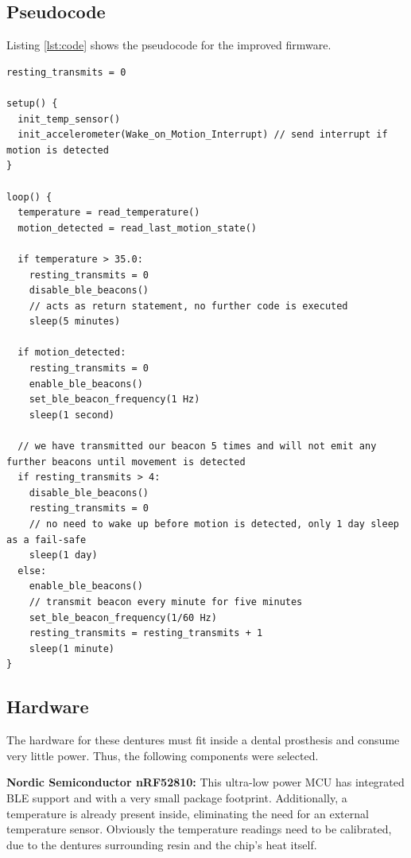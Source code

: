 \documentclass[a4paper,12pt]{article}
\begin{document}
\subsection{Pseudocode}
Listing \ref{lst:code} shows the pseudocode for the improved firmware.
\begin{lstlisting}[label=lst:code, caption=Firmware Pseudocode]
resting_transmits = 0

setup() {
  init_temp_sensor()
  init_accelerometer(Wake_on_Motion_Interrupt) // send interrupt if motion is detected
}

loop() {
  temperature = read_temperature()
  motion_detected = read_last_motion_state()

  if temperature > 35.0:
    resting_transmits = 0
    disable_ble_beacons()
    // acts as return statement, no further code is executed
    sleep(5 minutes)

  if motion_detected:
    resting_transmits = 0
    enable_ble_beacons()
    set_ble_beacon_frequency(1 Hz)
    sleep(1 second)

  // we have transmitted our beacon 5 times and will not emit any further beacons until movement is detected
  if resting_transmits > 4:
    disable_ble_beacons()
    resting_transmits = 0
    // no need to wake up before motion is detected, only 1 day sleep as a fail-safe
    sleep(1 day)
  else:
    enable_ble_beacons()
    // transmit beacon every minute for five minutes
    set_ble_beacon_frequency(1/60 Hz)
    resting_transmits = resting_transmits + 1
    sleep(1 minute)
}
\end{lstlisting}

\subsection{Hardware}
The hardware for these dentures must fit inside a dental prosthesis and consume very little power. Thus, the following components were selected.
\vspace{5pt}

\noindent\textbf{Nordic Semiconductor nRF52810:} This ultra-low power MCU has integrated BLE support and with  a very small package footprint. Additionally, a temperature is already present inside, eliminating the need for an external temperature sensor. Obviously the temperature readings need to be calibrated, due to the dentures surrounding resin and the chip's heat itself.

\vspace{5pt}
\end{document}
